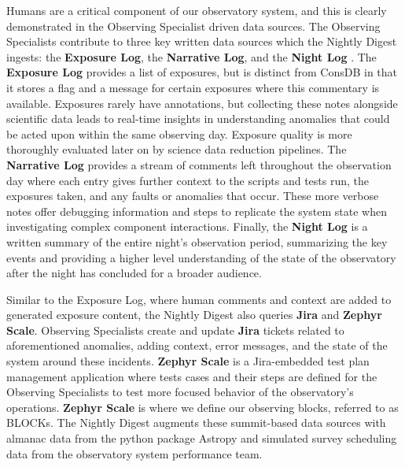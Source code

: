 Humans are a critical component of our observatory system, and this is clearly
demonstrated in the Observing Specialist driven data sources. The
Observing Specialists contribute to three key written data sources which the Nightly
Digest ingests: the \textbf{Exposure Log}, the \textbf{Narrative Log}, and the \textbf{Night Log}
\cite{Aranda26}. The \textbf{Exposure Log} provides a list of exposures, but is distinct from ConsDB in
that it stores a flag and a message for certain exposures where this commentary is
available. Exposures rarely have annotations, but collecting these notes alongside
scientific data leads to real-time insights in understanding anomalies that could be acted
upon within the same observing day. Exposure quality is more thoroughly evaluated later on
by science data reduction pipelines. The \textbf{Narrative Log} provides a stream of comments left
throughout the observation day where each entry gives further context to the scripts and
tests run, the exposures taken, and any faults or anomalies that occur. These more verbose
notes offer  debugging information and steps to replicate the system state when
investigating complex component interactions. Finally, the \textbf{Night Log} is a written summary
of the entire night’s observation period, summarizing the key events and providing a
higher level understanding of the state of the observatory after the night has concluded for a broader audience.

Similar to the Exposure Log, where human comments and context are added to generated
exposure content, the Nightly Digest also queries \textbf{Jira} and \textbf{Zephyr Scale}. Observing
Specialists create and update \textbf{Jira} tickets related to aforementioned anomalies, adding
context, error messages, and the state of the system around these incidents. \textbf{Zephyr Scale}
is a Jira-embedded test plan management application where tests cases and their steps are
defined for the Observing Specialists to test more focused behavior of the observatory’s
operations. \textbf{Zephyr Scale} is where we define our observing blocks, referred to as BLOCKs.
The Nightly Digest augments these summit-based data sources with almanac data
from the python package Astropy and simulated survey scheduling data from the observatory
system performance team.

